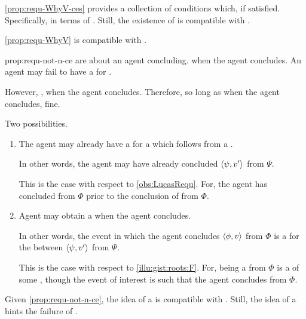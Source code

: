 \begin{note}
  \autoref{prop:requ-WhyV-ces} provides a collection of conditions which, if satisfied.
  Specifically, in terms of .
  Still, the existence of  is compatible with \issueConstraint{}.

  \begin{observation}%
    \label{prop:requ-not-n-ce}%
    \autoref{prop:requ-WhyV} is compatible with \issueConstraint{}.
  \end{observation}

  \begin{motivation}{prop:requ-not-n-ce}
     are about an agent concluding.
    \fc{} when the agent concludes.
    An agent may fail to have a \wit{} for \fc{}.

    However, \issueConstraint{}, \wit{} when the agent concludes.
    Therefore, so long as \wit{} when the agent concludes, fine.

    Two possibilities.
    \begin{enumerate}
    \item
      The agent may already have a \wit{} for a \ros{} which follows from a \fc{}.

      In other words, the agent may have already concluded \(\langle\psi, v'\rangle\) from \(\Psi\).

      This is the case with respect to \autoref{obs:LucasRequ}.
      For, the agent has concluded  from \(\Phi\) prior to the \agents{} conclusion of  from \(\Phi\).
    \item
      Agent may obtain a \wit{} when the agent concludes.

      In other words, the event in which the agent concludes \(\langle\phi, v\rangle\) from \(\Phi\) is a \wit{} for the \ros{} between \(\langle\psi, v'\rangle\) from \(\Psi\).

      This is the case with respect to \autoref{illu:gist:roots:F}.
      For,  being a \fc{} from \(\Phi\) is a \requ{} of some \se{}, though the event of interest is such that the agent concludes  from \(\Phi\).
    \end{enumerate}
    \vspace{-\baselineskip}
  \end{motivation}
\end{note}


\begin{note}
  Given \autoref{prop:requ-not-n-ce}, the idea of a \requ{} is compatible with \issueInclusion{}.
  Still, the idea of a  hints the failure of \issueConstraint{}.
\end{note}


